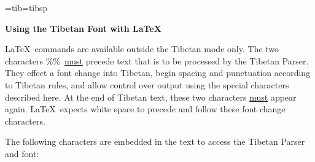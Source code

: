 \font\tibetan=tib\font\tibsp=tibsp 

\begin{center}
{\large\bf Using the Tibetan Font with \LaTeX}
\end{center}

\noindent
\LaTeX \ commands are available outside the Tibetan mode only.
The two characters \%\%\ \underline{must} precede
text that is to be processed by the Tibetan Parser.  They effect a font
change into Tibetan, begin spacing and punctuation according to Tibetan
rules, and allow control over output using the special characters
described here.  At the end of Tibetan text, these two characters
\underline{must} appear again.  \LaTeX \ expects white space to
precede and follow these font change characters.

\medskip
\noindent
The following characters are embedded in the text to access
the Tibetan Parser and font:

